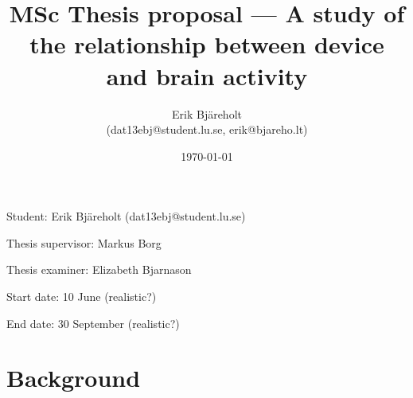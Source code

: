 \documentclass[a4paper]{article}   %
\title{MSc Thesis proposal --- A study of the relationship between device and brain activity}
\author{Erik Bjäreholt \\(dat13ebj@student.lu.se, erik@bjareho.lt)}
\date{\today}
\begin{document}
\maketitle

\noindent Student: Erik Bjäreholt (dat13ebj@student.lu.se)

\noindent Thesis supervisor: Markus Borg

\noindent Thesis examiner: Elizabeth Bjarnason

\noindent Start date: 10 June (realistic?)

\noindent End date: 30 September (realistic?)

\pagebreak

\tableofcontents

\pagebreak

\begin{comment}
\section{Requirements for this document}

The process for CS students: http://cs.lth.se/examensarbete/hur-gaar-det-till/
General CS dep resource: http://cs.lth.se/examensarbete/
General LTH resource: http://www.student.lth.se/studieinformation/examensarbete/examensarbetsprocessen/

 - [ ] Arbetstitel, inblandades namn och kontaktuppgifter samt preliminärt start- och slutdatum.
 - [ ] Bakgrund/kontext och motiv för examensarbetet.
 - [ ] Övergripande mål och problemställningar/forskningsfrågor.
 - [ ] Angreppssätt/metodik och metoder.
 - [ ] Vetenskaplig grund och beprövad erfarenhet som examensarbetet ska bygga vidare på. Detta kan t ex beskrivas i form av ett par nyckelreferenser till artiklar eller annat underlag.
 - [ ] Hur förväntas examensarbetet bidra till kunskapsutvecklingen?
 - [ ] Preliminär beskrivning av resurser som krävs för arbetets genomförande, t ex arbetsplats och utrustning, och hur dessa ordnas och finns tillgängliga.

\end{comment}

\section{Background}
\end{document}
